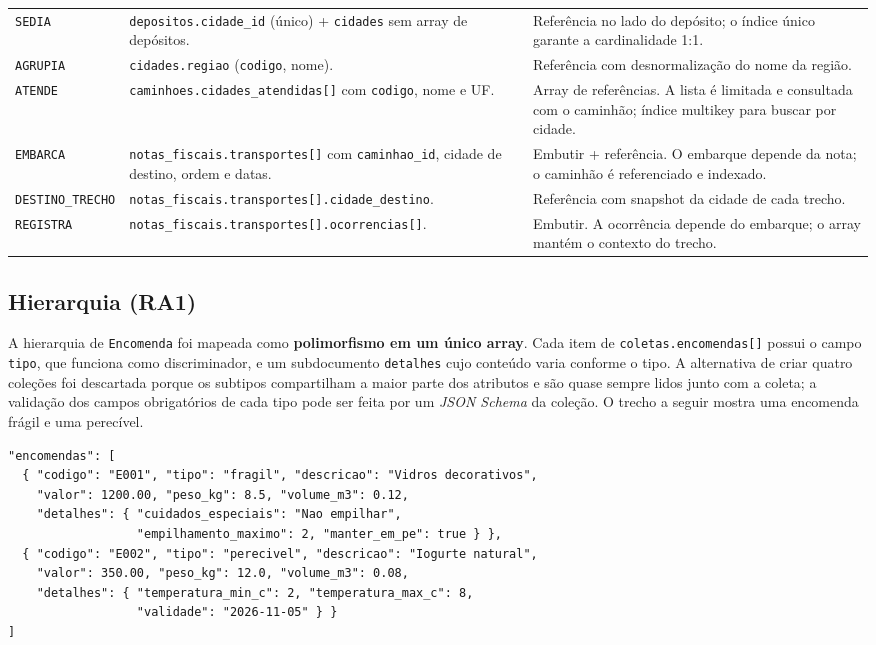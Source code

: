 {\begin{longtable}{@{}L{3.0cm}L{5.6cm}L{6.4cm}@{}}
\texttt{SEDIA} & \texttt{depositos.cidade\_id} (único) + \texttt{cidades} sem array de depósitos. & Referência no lado do depósito; o índice único garante a cardinalidade 1:1.\\

\texttt{AGRUPIA} & \texttt{cidades.regiao} (\texttt{codigo}, nome). & Referência com desnormalização do nome da região.\\

\texttt{ATENDE} & \texttt{caminhoes.\allowbreak cidades\_atendidas[]} com \texttt{codigo}, nome e UF. & Array de referências. A lista é limitada e consultada com o caminhão; índice multikey para buscar por cidade.\\

\texttt{EMBARCA} & \texttt{notas\_fiscais.\allowbreak transportes[]} com \texttt{caminhao\_id}, cidade de destino, ordem e datas. & Embutir + referência. O embarque depende da nota; o caminhão é referenciado e indexado.\\

\texttt{DESTINO\_TRECHO} & \texttt{notas\_fiscais.\allowbreak transportes[].\allowbreak cidade\_destino}. & Referência com snapshot da cidade de cada trecho.\\

\texttt{REGISTRA} & \texttt{notas\_fiscais.\allowbreak transportes[].\allowbreak ocorrencias[]}. & Embutir. A ocorrência depende do embarque; o array mantém o contexto do trecho.\\
\end{longtable}
}

\subsection{Hierarquia (RA1)}

A hierarquia de \texttt{Encomenda} foi mapeada como \textbf{polimorfismo em um único array}. Cada item de \texttt{coletas.encomendas[]} possui o campo \texttt{tipo}, que funciona como discriminador, e um subdocumento \texttt{detalhes} cujo conteúdo varia conforme o tipo. A alternativa de criar quatro coleções foi descartada porque os subtipos compartilham a maior parte dos atributos e são quase sempre lidos junto com a coleta; a validação dos campos obrigatórios de cada tipo pode ser feita por um \emph{JSON Schema} da coleção. O trecho a seguir mostra uma encomenda frágil e uma perecível.

\needspace{4.6cm}
\begin{lstlisting}[caption={Encomendas frágil e perecível embutidas em uma coleta},label={lst:hierarquia}]
"encomendas": [
  { "codigo": "E001", "tipo": "fragil", "descricao": "Vidros decorativos",
    "valor": 1200.00, "peso_kg": 8.5, "volume_m3": 0.12,
    "detalhes": { "cuidados_especiais": "Nao empilhar",
                  "empilhamento_maximo": 2, "manter_em_pe": true } },
  { "codigo": "E002", "tipo": "perecivel", "descricao": "Iogurte natural",
    "valor": 350.00, "peso_kg": 12.0, "volume_m3": 0.08,
    "detalhes": { "temperatura_min_c": 2, "temperatura_max_c": 8,
                  "validade": "2026-11-05" } }
]
\end{lstlisting}

